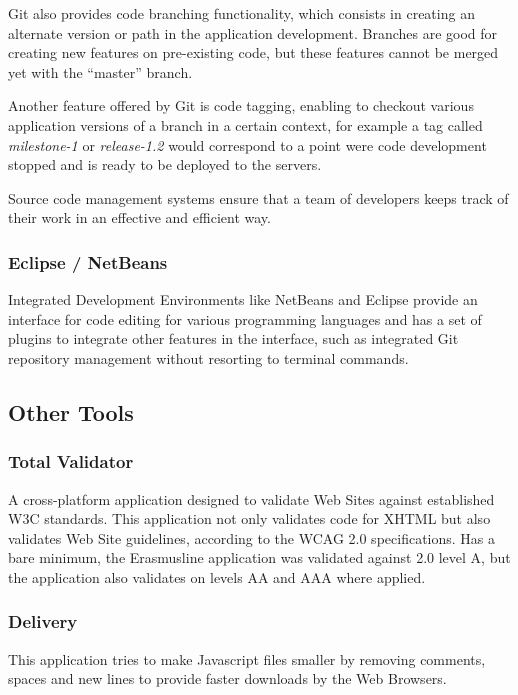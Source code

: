 Git also provides code branching functionality, which consists in creating an
alternate version or path in the application development. Branches are good for
creating new features on pre-existing code, but these features cannot be merged
yet with the “master” branch.

Another feature offered by Git is code tagging, enabling to checkout various
application versions of a branch in a certain context, for example a tag called
\emph{milestone-1} or \emph{release-1.2} would correspond to a point were code
development stopped and is ready to be deployed to the servers.

Source code management systems ensure that a team of developers keeps track of
their work in an effective and efficient way.

\subsubsection{Eclipse / NetBeans}
Integrated Development Environments like NetBeans and Eclipse provide an
interface for code editing for various programming languages and has a set of
plugins to integrate other features in the interface, such as integrated Git
repository management without resorting to terminal commands.

\subsection{Other Tools}

\subsubsection{Total Validator}

A cross-platform application designed to validate Web Sites
against established W3C standards. This application not only validates code for
XHTML but also validates Web Site  guidelines, according to
the WCAG 2.0 specifications. Has a bare minimum, the Erasmusline application was
validated against  2.0 level A, but the application also validates
on levels AA and AAA where applied.

\subsubsection{Delivery}

This application tries to make Javascript files smaller by removing comments,
spaces and new lines to provide faster downloads by the Web Browsers.

